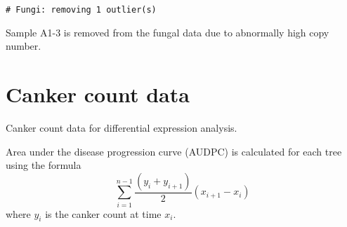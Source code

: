 \documentclass[
]{article}
\begin{document}
\begin{verbatim}
# Fungi: removing 1 outlier(s)
\end{verbatim}

Sample A1-3 is removed from the fungal data due to abnormally high copy
number.

\hypertarget{canker-count-data}{%
\section{Canker count data}\label{canker-count-data}}

Canker count data for differential expression analysis.

Area under the disease progression curve (AUDPC) is calculated for each
tree using the formula
\[\sum_{i=1}^{n-1} \frac{(y_i + y_{i+1})}{2} (x_{i+1} - x_i)\] where
\(y_i\) is the canker count at time \(x_i\).
\end{document}
